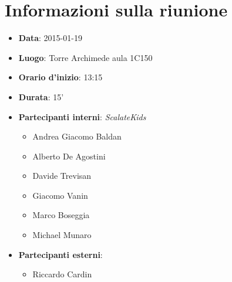 \documentclass{scalatekids-article}
\begin{document}
\section{Informazioni sulla riunione}
\begin{itemize}
\item \textbf{Data}: 2015-01-19
\item \textbf{Luogo}: Torre Archimede aula 1C150
\item \textbf{Orario d'inizio}: 13:15
\item \textbf{Durata}: 15'
\item \textbf{Partecipanti interni}: \textit{ScalateKids}
  \begin{itemize}
  \item Andrea Giacomo Baldan
  \item Alberto De Agostini
  \item Davide Trevisan
  \item Giacomo Vanin
  \item Marco Boseggia
  \item Michael Munaro
  \end{itemize}
\item \textbf{Partecipanti esterni}:
  \begin{itemize}
  \item Riccardo Cardin
  \end{itemize}
\end{itemize}
\end{document}
